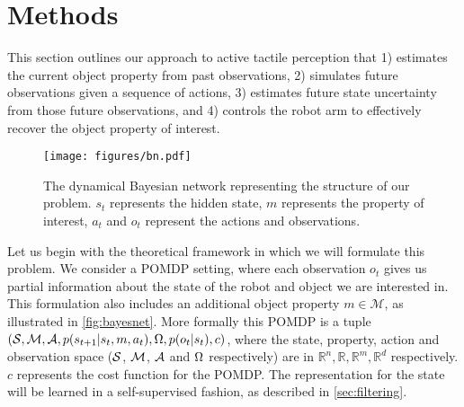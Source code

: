 \documentclass[anon]{l4dc2024}
\begin{document}
\section{Methods}
\label{sec:methods}
This section outlines our approach to active tactile perception that   1) estimates the current object property from past observations,  2) simulates future observations given a sequence of  actions, 3) estimates future state uncertainty from those future observations, and 4) controls the robot arm to effectively recover the object property of interest.


\begin{figure}
    \centering
    \texttt{[image: figures/bn.pdf]}
    \caption{The dynamical Bayesian network representing the structure of our problem. $s_t$ represents the hidden state, $m$ represents the property of interest, $a_t$ and $o_t$ represent the actions and observations.
    }
    \label{fig:bayesnet}
\end{figure}


\begin{sloppypar}
    Let us begin with the theoretical framework in which we will formulate this problem.
    We consider a \acf{POMDP} setting, where each  observation $o_t$ gives us partial information about the state of the robot and object we are interested in.
    This formulation also includes an additional object property $m \in \mathcal{M}$, as illustrated in \autoref{fig:bayesnet}.
    More formally this \ac{POMDP} is a tuple $(\mathcal{S}, \mathcal{M},  \mathcal{A}, p(s_{t+1}|s_t, m, a_t), \Omega, p(o_t|s_t), c)$, where
    the state, property, action and observation space ($\mathcal{S}$, $\mathcal{M}$, $\mathcal{A}$ and $\Omega$ respectively) are in $\mathbb{R}^n,  \mathbb{R},  \mathbb{R}^m, \mathbb{R}^d$ respectively.
    $c$ represents the cost function for the \ac{POMDP}.
    The representation for the state will be learned in a self-supervised fashion, as described in \autoref{sec:filtering}.
\end{sloppypar}
\end{document}
